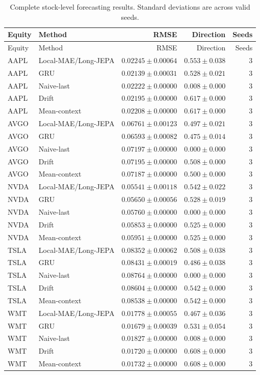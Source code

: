 \begin{longtable}{llrrr}
\caption{Complete stock-level forecasting results. Standard deviations are across valid seeds.}\label{tab:appendix_stock_metrics}\\
\toprule
Equity & Method & RMSE & Direction & Seeds \\
\midrule
\endfirsthead
\toprule
Equity & Method & RMSE & Direction & Seeds \\
\midrule
\endhead
AAPL & Local-MAE/Long-JEPA & $0.02245 \pm 0.00064$ & $0.553 \pm 0.038$ & 3 \\
AAPL & GRU & $0.02139 \pm 0.00031$ & $0.528 \pm 0.021$ & 3 \\
AAPL & Naive-last & $0.02222 \pm 0.00000$ & $0.008 \pm 0.000$ & 3 \\
AAPL & Drift & $0.02195 \pm 0.00000$ & $0.617 \pm 0.000$ & 3 \\
AAPL & Mean-context & $0.02208 \pm 0.00000$ & $0.617 \pm 0.000$ & 3 \\
AVGO & Local-MAE/Long-JEPA & $0.06761 \pm 0.00123$ & $0.497 \pm 0.021$ & 3 \\
AVGO & GRU & $0.06593 \pm 0.00082$ & $0.475 \pm 0.014$ & 3 \\
AVGO & Naive-last & $0.07197 \pm 0.00000$ & $0.000 \pm 0.000$ & 3 \\
AVGO & Drift & $0.07195 \pm 0.00000$ & $0.508 \pm 0.000$ & 3 \\
AVGO & Mean-context & $0.07187 \pm 0.00000$ & $0.500 \pm 0.000$ & 3 \\
NVDA & Local-MAE/Long-JEPA & $0.05541 \pm 0.00118$ & $0.542 \pm 0.022$ & 3 \\
NVDA & GRU & $0.05650 \pm 0.00056$ & $0.528 \pm 0.019$ & 3 \\
NVDA & Naive-last & $0.05760 \pm 0.00000$ & $0.000 \pm 0.000$ & 3 \\
NVDA & Drift & $0.05853 \pm 0.00000$ & $0.525 \pm 0.000$ & 3 \\
NVDA & Mean-context & $0.05951 \pm 0.00000$ & $0.525 \pm 0.000$ & 3 \\
TSLA & Local-MAE/Long-JEPA & $0.08352 \pm 0.00062$ & $0.508 \pm 0.038$ & 3 \\
TSLA & GRU & $0.08431 \pm 0.00019$ & $0.486 \pm 0.038$ & 3 \\
TSLA & Naive-last & $0.08764 \pm 0.00000$ & $0.000 \pm 0.000$ & 3 \\
TSLA & Drift & $0.08604 \pm 0.00000$ & $0.542 \pm 0.000$ & 3 \\
TSLA & Mean-context & $0.08538 \pm 0.00000$ & $0.542 \pm 0.000$ & 3 \\
WMT & Local-MAE/Long-JEPA & $0.01778 \pm 0.00055$ & $0.467 \pm 0.036$ & 3 \\
WMT & GRU & $0.01679 \pm 0.00039$ & $0.531 \pm 0.054$ & 3 \\
WMT & Naive-last & $0.01827 \pm 0.00000$ & $0.008 \pm 0.000$ & 3 \\
WMT & Drift & $0.01720 \pm 0.00000$ & $0.608 \pm 0.000$ & 3 \\
WMT & Mean-context & $0.01732 \pm 0.00000$ & $0.608 \pm 0.000$ & 3 \\
\bottomrule
\end{longtable}
